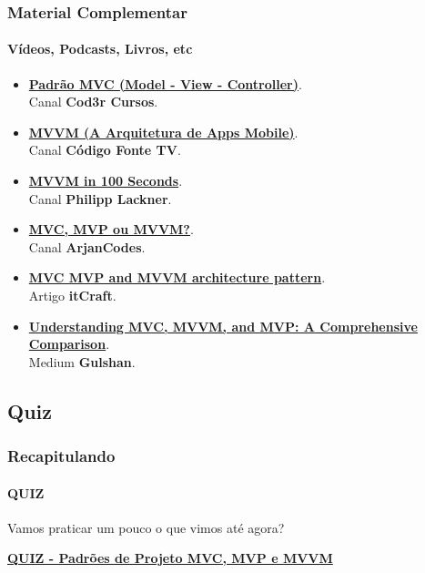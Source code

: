 \documentclass[
	9pt, %
	t, %
]{beamer}
\newcommand{\iconLink}[2]{\href{#1}{\faLink \hspace{0.2em} {#2}}}
\begin{document}
\begin{frame}
	\frametitle{Material Complementar}
	\framesubtitle{Vídeos, Podcasts, Livros, etc}

	\begin{itemize}
		\item \iconLink{https://youtu.be/mMDt9g7bMjk}{\textbf{Padrão MVC (Model - View - Controller)}}.\\Canal \textbf{Cod3r Cursos}.\\
		\item \iconLink{https://youtu.be/B2pJWtSyVFA}{\textbf{MVVM (A Arquitetura de Apps Mobile)}}.\\Canal \textbf{Código Fonte TV}.\\
		\item \iconLink{https://www.youtube.com/watch?v=-xTqfilaYow}{\textbf{MVVM in 100 Seconds}}.\\Canal \textbf{Philipp Lackner}.\\
		\item \iconLink{https://www.youtube.com/watch?v=eHhXoCNCI1c}{\textbf{MVC, MVP ou MVVM?}}.\\Canal \textbf{ArjanCodes}.\\
		\item \iconLink{https://itcraftapps.com/blog/mvc-mvp-and-mvvm-architecture-pattern-introduction/}{\textbf{MVC MVP and MVVM architecture pattern}}.\\Artigo \textbf{itCraft}.\\
		\item \iconLink{https://blog.stackademic.com/understanding-mvc-mvvm-and-mvp-a-comprehensive-comparison-324fd6e3c730}{\textbf{Understanding MVC, MVVM, and MVP: A Comprehensive Comparison}}.\\Medium \textbf{Gulshan}.\\
	\end{itemize}

\end{frame}

\subsection{Quiz}

\begin{frame}
	\frametitle{Recapitulando}
	\framesubtitle{QUIZ}

	Vamos praticar um pouco o que vimos até agora? \vfill

	\bigskip
	\centering

	\iconLink{https://quizizz.com/admin/quiz/659d7e449a88c830fdf1801c?source=quiz_share}{\textbf{QUIZ - Padrões de Projeto MVC, MVP e MVVM}}
	\vfill

\end{frame}
\end{document}
